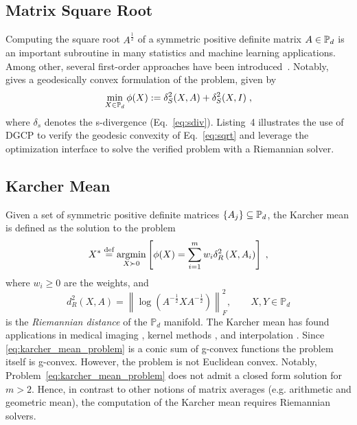 \documentclass[twoside,11pt]{article}
\begin{document}
\subsection{Matrix Square Root}
Computing the square root $A^{\frac{1}{2}}$ of a symmetric positive definite matrix $A \in \mathbb{P}_d$ is an important subroutine in many statistics and machine learning applications. Among other, several first-order approaches have been introduced~\citep{jain2017global,sra2015matrix}. Notably,~\cite{sra2015matrix} gives a geodesically convex formulation of the problem, given by
\begin{equation}\label{eq:sqrt}
    \min _{X \in \mathbb{P}_d} \phi(X) := \delta_S^2(X, A)+\delta_S^2(X, I) \; ,
\end{equation}
where $\delta_s$ denotes the s-divergence (Eq.~\ref{eq:sdiv}). Listing~4 %
illustrates the use of DGCP to verify the geodesic convexity of Eq.~\ref{eq:sqrt} and leverage the optimization interface to solve the verified problem with a Riemannian solver.

\subsection{Karcher Mean}\label{sec:karcher_mean}

Given a set of symmetric positive definite matrices $\{A_j\} \subseteq \mathbb{P}_d$, the Karcher mean is defined as the solution to the problem
\begin{equation}\label{eq:karcher_mean_problem}
    X^* \stackrel{\text{def}}{=} \underset{X \succ 0}{\operatorname{argmin}}\left[\phi(X)=\sum_{i=1}^m w_i \delta_R^2\left(X, A_i\right)\right] \; ,
\end{equation}
where $w_i \geq 0$ are the weights, and 
\begin{equation}
    d^2_R(X, A) = \left \| \log \left(A^{-\frac{1}{2}}X A^{-\frac{1}{2}} \right)\right \|_F^2,
    \qquad X,Y \in \mathbb{P}_d
\end{equation}
is the \textit{Riemannian distance} of the $\mathbb{P}_d$ manifold. The Karcher mean has found applications in medical imaging \citep{Carmichael2013-wq}, kernel methods \citep{clustering}, and interpolation \citep{absil_interpolation}. Since \eqref{eq:karcher_mean_problem} is a conic sum of g-convex functions the problem itself is g-convex. However, the problem is not Euclidean convex. Notably, Problem~\ref{eq:karcher_mean_problem} does not admit a closed form solution for $m>2$. Hence, in contrast to other notions of matrix averages (e.g. arithmetic and geometric mean), the computation of the Karcher mean requires Riemannian solvers.
\end{document}
